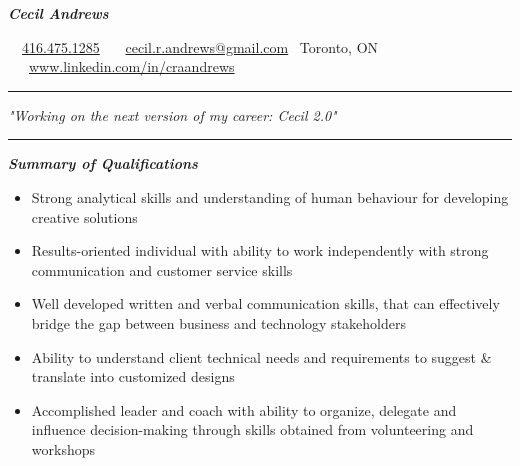 \documentclass{article}
\begin{document}
\begin{center}
   
\Huge \textcolor{ablue}{\textit{\textbf{Cecil Andrews}}}

\end{center}

\begin{center}
 
\faPhone \ \   \href{  tel:+1 416.475.1285}{416.475.1285} \textbar  \ \faEnvelope \  \  \href{mailto:cecil.r.andrews@gmail.com}{cecil.r.andrews@gmail.com}  \textbar  \ Toronto, ON   \textbar  \  \faLinkedin \  \ \href{http://www.linkedin.com/in/craandrews}{www.linkedin.com/in/craandrews}

\end{center}


\noindent
{\color{ablue} \rule{\linewidth}{0.5mm} }
\begin{center}
\setmainfont{Times New Roman}
\textcolor{ablue}{\LARGE \textit{"Working on the next version of my career: Cecil 2.0"}}
\end{center}
\textnormal
\noindent
{\color{ablue} \rule{\linewidth}{0.5mm} }

\begin{center}
\large \textcolor{ablue}{\textit{\textbf{Summary of Qualifications}}}
\end{center}

\begin{flushleft}
\begin{itemize}
\item Strong analytical skills and understanding of human behaviour for developing creative solutions\\
\item Results-oriented individual with ability to work independently with strong communication and customer service skills \\
\item Well developed written and verbal communication skills, that can effectively bridge the gap between business and technology stakeholders \\
\item Ability to understand client technical needs and requirements to suggest \& translate into customized designs\\
\item Accomplished leader and  coach with ability to organize, delegate and influence decision-making through skills obtained from volunteering and workshops
\end{itemize}
\end{flushleft}
\end{document}

